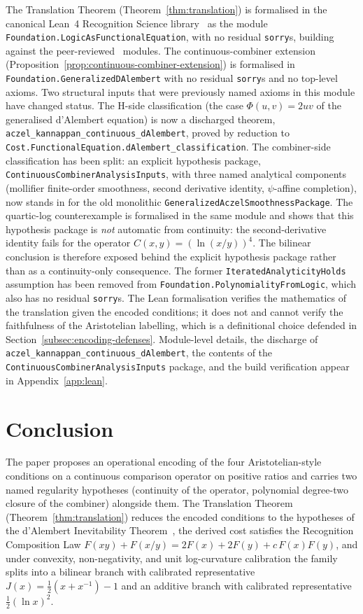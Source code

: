 \documentclass[11pt,a4paper]{article}
\theoremstyle{definition}
\theoremstyle{remark}
\begin{document}
The Translation Theorem (Theorem~\ref{thm:translation}) is formalised
in the canonical Lean~4 Recognition Science
library~\cite{LeanLibrary2026} as the module
\texttt{Foundation.LogicAsFunctionalEquation}, with no residual
\texttt{sorry}s, building against the
peer-reviewed~\cite{WashburnZlatanovicAllahyarov2026,
WashburnZlatanovic2026} modules. The continuous-combiner extension
(Proposition~\ref{prop:continuous-combiner-extension}) is formalised
in \texttt{Foundation.GeneralizedDAlembert} with no residual
\texttt{sorry}s and no top-level axioms. Two structural inputs that
were previously named axioms in this module have changed status. The
H-side classification (the case $\Phi(u, v) = 2 u v$ of the
generalised d'Alembert equation) is now a discharged theorem,
\texttt{aczel\_kannappan\_continuous\_dAlembert}, proved by reduction
to \texttt{Cost.FunctionalEquation.dAlembert\_classification}. The
combiner-side classification has been split: an explicit hypothesis
package, \texttt{ContinuousCombinerAnalysisInputs}, with three named
analytical components (mollifier finite-order smoothness, second
derivative identity, $\psi$-affine completion), now stands in for the
old monolithic \texttt{GeneralizedAczelSmoothnessPackage}. The
quartic-log counterexample is formalised in the same module and shows
that this hypothesis package is \emph{not} automatic from continuity:
the second-derivative identity fails for the operator
$C(x, y) = (\ln(x/y))^4$. The bilinear conclusion is therefore exposed
behind the explicit hypothesis package rather than as a continuity-only
consequence. The former \texttt{IteratedAnalyticityHolds} assumption has
been removed from \texttt{Foundation.PolynomialityFromLogic}, which
also has no residual \texttt{sorry}s. The Lean formalisation verifies
the mathematics of the translation given the encoded conditions; it
does not and cannot verify the faithfulness of the Aristotelian
labelling, which is a definitional choice defended in
Section~\ref{subsec:encoding-defenses}. Module-level details, the
discharge of \texttt{aczel\_kannappan\_continuous\_dAlembert}, the
contents of the \texttt{ContinuousCombinerAnalysisInputs} package, and
the build verification appear in Appendix~\ref{app:lean}.

\section{Conclusion}\label{sec:conclusion}

The paper proposes an operational encoding of the four
Aristotelian-style conditions on a continuous comparison operator on
positive ratios and carries two named regularity hypotheses (continuity
of the operator, polynomial degree-two closure of the combiner)
alongside them. The Translation Theorem (Theorem~\ref{thm:translation})
reduces the encoded conditions to the hypotheses of the d'Alembert
Inevitability Theorem~\cite{WashburnZlatanovicAllahyarov2026}, the
derived cost satisfies the Recognition Composition Law $F(xy) +
F(x/y) = 2F(x) + 2F(y) + c\,F(x)F(y)$, and under convexity,
non-negativity, and unit log-curvature calibration the family splits
into a bilinear branch with calibrated representative
$J(x) = \tfrac{1}{2}(x + x^{-1}) - 1$ and an additive branch with
calibrated representative $\tfrac{1}{2}(\ln x)^2$.
\end{document}
